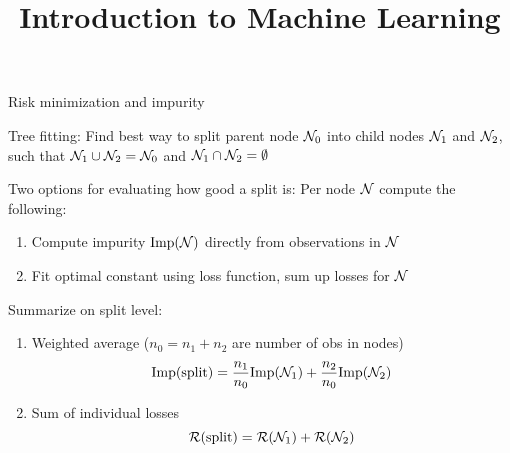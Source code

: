 \documentclass[11pt,compress,t,notes=noshow, xcolor=table]{beamer}
\title{Introduction to Machine Learning}
\begin{document}
    

\begin{framei}[sep=M]{Risk minimization and impurity}


    \item Tree fitting: Find best way to split parent node $\mathcal{N}_0$ into child nodes $\mathcal{N}_1$ and $\mathcal{N}_2$, such that $\mathcal{N}_1 \cup \mathcal{N}_2 = \mathcal{N}_0$ and $\mathcal{N}_1 \cap \mathcal{N}_2 = \emptyset$
    \item Two options for evaluating how good a split is: Per node $\mathcal{N}$ compute the following:
\begin{enumerate}
    \item Compute impurity $\text{Imp}(\mathcal{N})$ directly from observations in $\mathcal{N}$
    \item Fit optimal constant using loss function, sum up losses for $\mathcal{N}$
\end{enumerate}
    \item Summarize on split level:
    \begin{enumerate}
        \item Weighted average ($n_0 = n_1 + n_2$ are number of obs in nodes)
        $$\text{Imp(split)} = \frac{n_1}{n_0} \text{Imp}(\mathcal{N}_1) + \frac{n_2}{n_0} \text{Imp}(\mathcal{N}_2)$$
        \item Sum of individual losses
        $$\mathcal{R}(\text{split}) = \mathcal{R}(\mathcal{N}_1) + \mathcal{R}(\mathcal{N}_2)$$
    \end{enumerate}

\end{framei}
\end{document}
